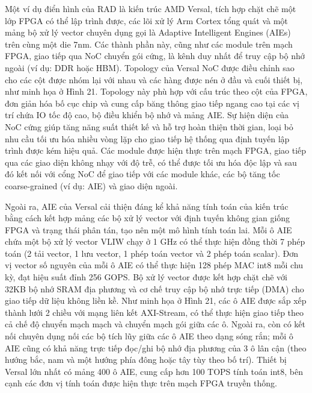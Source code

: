 \documentclass[a4paper]{article}
\begin{document}
Một ví dụ điển hình của RAD là kiến trúc AMD Versal, tích hợp chặt chẽ một lớp FPGA có thể lập trình được, các lõi xử lý Arm Cortex tổng quát và một mảng bộ xử lý vector chuyên dụng gọi là Adaptive Intelligent Engines (AIEs) trên cùng một die 7nm. Các thành phần này, cũng như các module trên mạch FPGA, giao tiếp qua NoC chuyển gói cứng, là kênh duy nhất để truy cập bộ nhớ ngoài (ví dụ: DDR hoặc HBM). Topology của Versal NoC được điều chỉnh sao cho các cột được nhóm lại với nhau và các hàng được nén ở đầu và cuối thiết bị, như minh họa ở Hình 21. Topology này phù hợp với cấu trúc theo cột của FPGA, đơn giản hóa bố cục chip và cung cấp băng thông giao tiếp ngang cao tại các vị trí chứa IO tốc độ cao, bộ điều khiển bộ nhớ và mảng AIE. Sự hiện diện của NoC cứng giúp tăng năng suất thiết kế và hỗ trợ hoàn thiện thời gian, loại bỏ nhu cầu tối ưu hóa nhiều vòng lặp cho giao tiếp hệ thống qua định tuyến lập trình được kém hiệu quả. Các module được hiện thực trên mạch FPGA, giao tiếp qua các giao diện không nhạy với độ trễ, có thể được tối ưu hóa độc lập và sau đó kết nối với cổng NoC để giao tiếp với các module khác, các bộ tăng tốc coarse-grained (ví dụ: AIE) và giao diện ngoài.

Ngoài ra, AIE của Versal cải thiện đáng kể khả năng tính toán của kiến trúc bằng cách kết hợp mảng các bộ xử lý vector với định tuyến không gian giống FPGA và trạng thái phân tán, tạo nên một mô hình tính toán lai. Mỗi ô AIE chứa một bộ xử lý vector VLIW chạy ở 1 GHz có thể thực hiện đồng thời 7 phép toán (2 tải vector, 1 lưu vector, 1 phép toán vector và 2 phép toán scalar). Đơn vị vector số nguyên của mỗi ô AIE có thể thực hiện 128 phép MAC int8 mỗi chu kỳ, đạt hiệu suất đỉnh 256 GOPS. Bộ xử lý vector được kết hợp chặt chẽ với 32KB bộ nhớ SRAM địa phương và cơ chế truy cập bộ nhớ trực tiếp (DMA) cho giao tiếp dữ liệu không liền kề. Như minh họa ở Hình 21, các ô AIE được sắp xếp thành lưới 2 chiều với mạng liên kết AXI-Stream, có thể thực hiện giao tiếp theo cả chế độ chuyển mạch mạch và chuyển mạch gói giữa các ô. Ngoài ra, còn có kết nối chuyên dụng nối các bộ tích lũy giữa các ô AIE theo dạng sóng rắn; mỗi ô AIE cũng có khả năng trực tiếp đọc/ghi bộ nhớ địa phương của 3 ô lân cận (theo hướng bắc, nam và một hướng phía đông hoặc tây tùy theo bố trí). Thiết bị Versal lớn nhất có mảng 400 ô AIE, cung cấp hơn 100 TOPS tính toán int8, bên cạnh các đơn vị tính toán được hiện thực trên mạch FPGA truyền thống.
\end{document}

